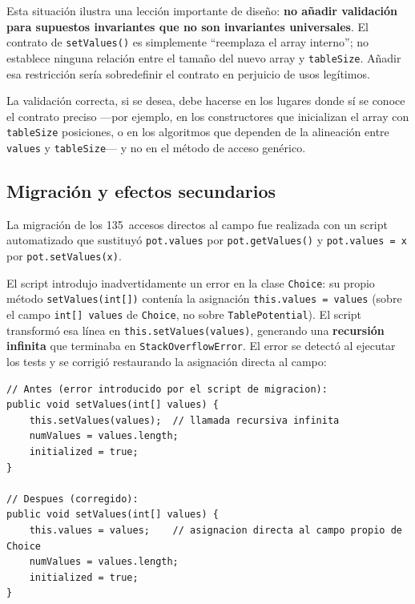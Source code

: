 \documentclass[11pt,a4paper]{article}
\newcommand{\code}[1]{\texttt{#1}}
\begin{document}
Esta situación ilustra una lección importante de diseño: \textbf{no
añadir validación para supuestos invariantes que no son invariantes
universales}.  El contrato de \code{setValues()} es simplemente
``reemplaza el array interno''; no establece ninguna relación entre el
tamaño del nuevo array y \code{tableSize}.  Añadir esa restricción
sería sobredefinir el contrato en perjuicio de usos legítimos.

La validación correcta, si se desea, debe hacerse en los lugares
donde sí se conoce el contrato preciso ---por ejemplo, en los
constructores que inicializan el array con \code{tableSize} posiciones,
o en los algoritmos que dependen de la alineación entre \code{values}
y \code{tableSize}--- y no en el método de acceso genérico.

\subsection{Migración y efectos secundarios}

La migración de los 135~accesos directos al campo fue realizada con un
script automatizado que sustituyó \code{pot.values} por
\code{pot.getValues()} y \code{pot.values = x} por
\code{pot.setValues(x)}.

El script introdujo inadvertidamente un error en la clase
\code{Choice}: su propio método \code{setValues(int[])} contenía la
asignación \code{this.values = values} (sobre el campo \code{int[]
values} de \code{Choice}, no sobre \code{TablePotential}).  El script
transformó esa línea en \code{this.setValues(values)}, generando una
\textbf{recursión infinita} que terminaba en \code{StackOverflowError}.
El error se detectó al ejecutar los tests y se corrigió restaurando la
asignación directa al campo:

\begin{lstlisting}[caption={Corrección de la recursión infinita en \texttt{Choice.setValues()}.},
                   label=lst:choice-setvalues]
// Antes (error introducido por el script de migracion):
public void setValues(int[] values) {
    this.setValues(values);  // llamada recursiva infinita
    numValues = values.length;
    initialized = true;
}

// Despues (corregido):
public void setValues(int[] values) {
    this.values = values;    // asignacion directa al campo propio de Choice
    numValues = values.length;
    initialized = true;
}
\end{lstlisting}
\end{document}
